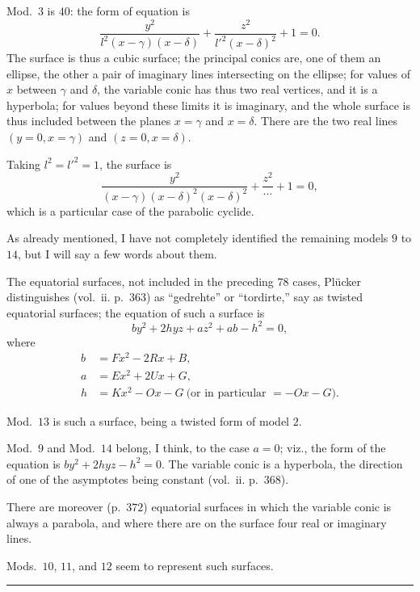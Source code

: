 \documentclass[11pt,a4paper]{article}
\begin{document}
\medskip
Mod.\ $3$ is $40$: the form of equation is
\[
\frac{y^2}{l^2(x - \gamma)(x - \delta)} + \frac{z^2}{l'^2(x - \delta)^2} + 1 = 0.
\]
The surface is thus a cubic surface; the principal conics are, one of
them an ellipse, the other a pair of imaginary lines intersecting on the
ellipse; for values of $x$ between $\gamma$ and $\delta$, the variable
conic has thus two real vertices, and it is a hyperbola; for values
beyond these limits it is imaginary, and the whole surface is thus
included between the planes $x = \gamma$ and $x = \delta$. There are the
two real lines $(y = 0, x = \gamma)$ and $(z = 0, x = \delta)$.

Taking $l^2 = l'^2 = 1$, the surface is
\[
\frac{y^2}{(x - \gamma)(x - \delta)^2(x - \delta)^2} + \frac{z^2}{\dotsb} + 1 = 0,
\]
which is a particular case of the parabolic cyclide.

\medskip

As already mentioned, I have not completely identified the remaining
models $9$ to $14$, but I will say a few words about them.

The equatorial surfaces, not included in the preceding $78$ cases,
Pl\"ucker distinguishes (vol.~ii. p.~$363$) as ``gedrehte'' or
``tordirte,'' say as twisted equatorial surfaces; the equation of such a
surface is
\[
b y^2 + 2 h y z + a z^2 + a b - h^2 = 0,
\]
where
\[
\begin{aligned}
b &= F x^2 - 2 R x + B, \\
a &= E x^2 + 2 U x + G, \\
h &= K x^2 - O x - G\ \text{(or in particular $= - O x - G$)}.
\end{aligned}
\]

Mod.\ $13$ is such a surface, being a twisted form of model $2$.

Mod.\ $9$ and Mod.\ $14$ belong, I think, to the case $a = 0$; viz., the
form of the equation is $b y^2 + 2 h y z - h^2 = 0$. The variable conic
is a hyperbola, the direction of one of the asymptotes being constant
(vol.~ii. p.~$368$).

There are moreover (p.~$372$) equatorial surfaces in which the variable
conic is always a parabola, and where there are on the surface four real
or imaginary lines.

Mods.\ $10$, $11$, and $12$ seem to represent such surfaces.

\bigskip
\hrule
\bigskip

\end{document}
